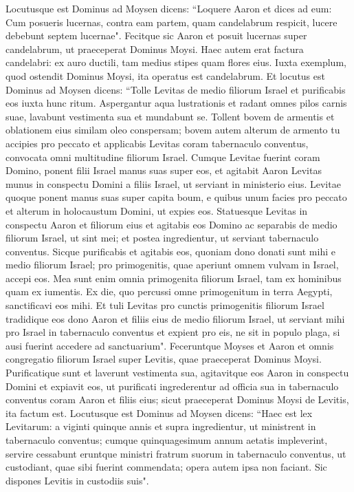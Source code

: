 \begin{biblechapter}  
\verse Locutusque est Dominus ad Moysen dicens: 
\verse “Loquere Aaron et dices ad eum: Cum posueris lucernas, contra eam partem, quam candelabrum respicit, lucere debebunt septem lucernae". 
\verse Fecitque sic Aaron et posuit lucernas super candelabrum, ut praeceperat Dominus Moysi. 
\verse Haec autem erat factura candelabri: ex auro ductili, tam medius stipes quam flores eius. Iuxta exemplum, quod ostendit Dominus Moysi, ita operatus est candelabrum. 
\verse Et locutus est Dominus ad Moysen dicens: 
\verse “Tolle Levitas de medio filiorum Israel et purificabis eos 
\verse iuxta hunc ritum. Aspergantur aqua lustrationis et radant omnes pilos carnis suae, lavabunt vestimenta sua et mundabunt se. 
\verse Tollent bovem de armentis et oblationem eius similam oleo conspersam; bovem autem alterum de armento tu accipies pro peccato 
\verse et applicabis Levitas coram tabernaculo conventus, convocata omni multitudine filiorum Israel. 
\verse Cumque Levitae fuerint coram Domino, ponent filii Israel manus suas super eos, 
\verse et agitabit Aaron Levitas munus in conspectu Domini a filiis Israel, ut serviant in ministerio eius. 
\verse Levitae quoque ponent manus suas super capita boum, e quibus unum facies pro peccato et alterum in holocaustum Domini, ut expies eos. 
\verse Statuesque Levitas in conspectu Aaron et filiorum eius et agitabis eos Domino 
\verse ac separabis de medio filiorum Israel, ut sint mei;  
\verse et postea ingredientur, ut serviant tabernaculo conventus. Sicque purificabis et agitabis eos, 
\verse quoniam dono donati sunt mihi e medio filiorum Israel; pro primogenitis, quae aperiunt omnem vulvam in Israel, accepi eos. 
\verse Mea sunt enim omnia primogenita filiorum Israel, tam ex hominibus quam ex iumentis. Ex die, quo percussi omne primogenitum in terra Aegypti, sanctificavi eos mihi. 
\verse Et tuli Levitas pro cunctis primogenitis filiorum Israel 
\verse tradidique eos dono Aaron et filiis eius de medio filiorum Israel, ut serviant mihi pro Israel in tabernaculo conventus et expient pro eis, ne sit in populo plaga, si ausi fuerint accedere ad sanctuarium". 
\verse Feceruntque Moyses et Aaron et omnis congregatio filiorum Israel super Levitis, quae praeceperat Dominus Moysi. 
\verse Purificatique sunt et laverunt vestimenta sua, agitavitque eos Aaron in conspectu Domini et expiavit eos, ut purificati 
\verse ingrederentur ad officia sua in tabernaculo conventus coram Aaron et filiis eius; sicut praeceperat Dominus Moysi de Levitis, ita factum est. 
\verse Locutusque est Dominus ad Moysen dicens: 
\verse “Haec est lex Levitarum: a viginti quinque annis et supra ingredientur, ut ministrent in tabernaculo conventus; 
\verse cumque quinquagesimum annum aetatis impleverint, servire cessabunt 
\verse eruntque ministri fratrum suorum in tabernaculo conventus, ut custodiant, quae sibi fuerint commendata; opera autem ipsa non faciant. Sic dispones Levitis in custodiis suis". 
\end{biblechapter}

